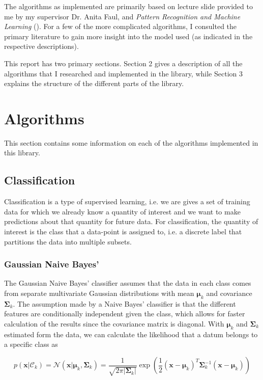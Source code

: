\documentclass[a4paper]{article}
\begin{document}

The algorithms as implemented are primarily based on lecture slide provided to me by my supervisor Dr. Anita Faul, and \textit{Pattern Recognition and Machine Learning} (\cite{PRML}). For a few of the more complicated algorithms, I consulted the primary literature to gain more insight into the model used (as indicated in the respective descriptions).

This report has two primary sections. Section 2 gives a description of all the algorithms that I researched and implemented in the library, while Section 3 explains the structure of the different parts of the library.


\section{Algorithms}
This section contains some information on each of the algorithms implemented in this library. %

\subsection{Classification}
Classification is a type of supervised learning, i.e. we are gives a set of training data for which we already know a quantity of interest and we want to make predictions about that quantity for future data. For classification, the quantity of interest is the class that a data-point is assigned to, i.e. a discrete label that partitions the data into multiple subsets.

\subsubsection{Gaussian Naive Bayes'}
The Gaussian Naive Bayes' classifier assumes that the data in each class comes from separate multivariate Gaussian distributions with mean $\bm{\mu}_k$ and covariance $\bm{\Sigma}_k$. The assumption made by a Naive Bayes' classifier is that the different features are conditionally independent given the class, which allows for faster calculation of the results since the covariance matrix is diagonal. With $\bm{\mu}_k$ and $\bm{\Sigma}_k$ estimated form the data, we can calculate the likelihood that a datum belongs to a specific class as

\[ p(\mathbf{x} | \mathcal{C}_k) = \mathcal{N}(\mathbf{x} | \bm{\mu}_k, \bm{\Sigma}_k) = \frac{1}{\sqrt{2 \pi |\bm{\Sigma}_k|}} \exp\left(\frac{1}{2} (\mathbf{x} - \bm{\mu}_k)^T\bm{\Sigma}_k^{-1}(\mathbf{x} - \bm{\mu}_k)\right) \] 
\end{document}
